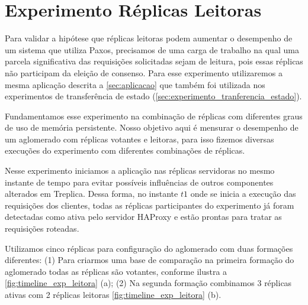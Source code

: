 \begin{table}[htb]
\end{table}


\section{Experimento Réplicas Leitoras}\label{sec:experimento_replicas_leitoras}

Para validar a hipótese que réplicas leitoras podem aumentar o desempenho de um sistema
que utiliza Paxos, precisamos de uma carga de trabalho na qual uma parcela significativa
das requisições solicitadas sejam de leitura, pois essas réplicas não participam da
eleição de consenso. Para esse experimento utilizaremos a mesma aplicação descrita a
\autoref{sec:aplicacao} que também foi utilizada nos experimentos de transferência de
estado (\autoref{sec:experimento_tranferencia_estado}).

Fundamentamos esse experimento na combinação de réplicas com diferentes graus de uso de
memória persistente. Nosso objetivo aqui é mensurar o desempenho de um aglomerado com
réplicas votantes e leitoras, para isso fizemos diversas execuções do experimento com
diferentes combinações de réplicas.

Nesse experimento iniciamos a aplicação nas réplicas servidoras no mesmo instante de tempo
para evitar possíveis influências de outros componentes alterados em Treplica. Dessa
forma, no instante $t1$ onde se inicia a execução das requisições dos clientes, todas as
réplicas participantes do experimento já foram detectadas como ativa pelo servidor HAProxy
e estão prontas para tratar as requisições roteadas.

Utilizamos cinco réplicas para configuração do aglomerado com duas formações diferentes:
(1) Para criarmos uma base de comparação na primeira formação do aglomerado todas as
réplicas são votantes, conforme ilustra a \autoref{fig:timeline_exp_leitora} (a); (2) Na
segunda formação combinamos 3 réplicas ativas com 2 réplicas leitoras
\autoref{fig:timeline_exp_leitora} (b).

